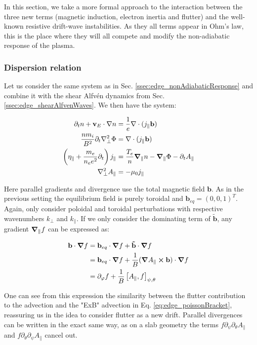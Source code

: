 In this section, we take a more formal approach to the interaction between the three new terms (magnetic induction, electron inertia and flutter) and the well-known resistive drift-wave instabilities. As they all terms appear in Ohm's law, this is the place where they will all compete and modify the non-adiabatic response of the plasma. 

\subsubsection{Dispersion relation}
\label{ssec:edge_DAW_dispersionRelation}

Let us consider the same system as in Sec. \ref{ssec:edge_nonAdiabaticResponse} and combine it with the shear Alfvén dynamics from Sec. \ref{ssec:edge_shearAlfvenWaves}. We then have the system: 

\begin{align}
	\partial_t n + \mathbf{v}_E\cdot\nabla n &= \frac{1}{e}\nabla\cdot(j_\parallel \mathbf{b}) \\
	\frac{nm_i}{B^2}\partial_t\nabla_\perp^2\Phi &= \nabla\cdot(j_\parallel \mathbf{b}) \\
	\left(\eta_\parallel + \frac{m_e}{n_ee^2}\partial_t \right) j_\parallel &= \frac{T_e}{n}\grad_\parallel n - \grad_\parallel \Phi - \partial_t A_\parallel \\
	\nabla_\perp^2 A_\parallel &= -\mu_0 j_\parallel
\end{align}

Here parallel gradients and divergence use the total magnetic field $\mathbf{b}$. As in the previous setting the equilibrium field is purely toroidal and $\mathbf{b}_{eq} = (0,0,1)^T$. Again, only consider poloidal and toroidal perturbations with respective wavenumbers $k_\perp$ and $k_\parallel$. If we only consider the dominating term of $\mathbf{\tilde{b}}$, any gradient $\grad_\parallel f$ can be expressed as:

\begin{align}
	\mathbf{b}\cdot\grad f &= \mathbf{b}_{eq}\cdot\grad f + \mathbf{\tilde{b}} \cdot \grad f \nonumber\\
	&= \mathbf{b}_{eq}\cdot\grad f + \frac{1}{B}(\grad A_\parallel \cross \mathbf{b})\cdot\grad f \nonumber\\ 
	&= \partial_\varphi f + \frac{1}{B}\left[A_\parallel,f\right]_{\psi,\theta}
\end{align}

One can see from this expression the similarity between the flutter contribution to the advection and the "ExB" advection in Eq. \ref{eq:edge_poissonBracket}, reassuring us in the idea to consider flutter as a new drift. Parallel divergences can be written in the exact same way, as on a slab geometry the terms $f\partial_\psi\partial_\theta A_\parallel$ and $f\partial_\theta\partial_\psi A_\parallel$ cancel out.

